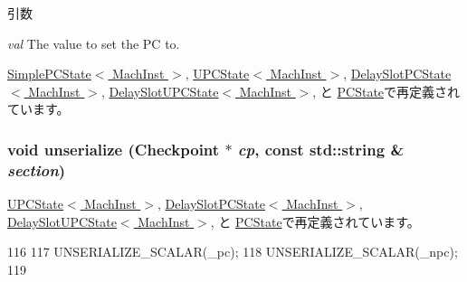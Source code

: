 \begin{DoxyParams}{引数}
\item[{\em val}]The value to set the PC to. \end{DoxyParams}


\hyperlink{classGenericISA_1_1SimplePCState_a9a5b900e841dd75dc81970850547918f}{SimplePCState$<$ MachInst $>$}, \hyperlink{classGenericISA_1_1UPCState_a9a5b900e841dd75dc81970850547918f}{UPCState$<$ MachInst $>$}, \hyperlink{classGenericISA_1_1DelaySlotPCState_a9a5b900e841dd75dc81970850547918f}{DelaySlotPCState$<$ MachInst $>$}, \hyperlink{classGenericISA_1_1DelaySlotUPCState_a9a5b900e841dd75dc81970850547918f}{DelaySlotUPCState$<$ MachInst $>$}, と \hyperlink{classX86ISA_1_1PCState_a9a5b900e841dd75dc81970850547918f}{PCState}で再定義されています。\hypertarget{classGenericISA_1_1PCStateBase_af22e5d6d660b97db37003ac61ac4ee49}{
\subsubsection[{unserialize}]{\setlength{\rightskip}{0pt plus 5cm}void unserialize ({\bf Checkpoint} $\ast$ {\em cp}, \/  const std::string \& {\em section})}}
\label{classGenericISA_1_1PCStateBase_af22e5d6d660b97db37003ac61ac4ee49}


\hyperlink{classGenericISA_1_1UPCState_af22e5d6d660b97db37003ac61ac4ee49}{UPCState$<$ MachInst $>$}, \hyperlink{classGenericISA_1_1DelaySlotPCState_af22e5d6d660b97db37003ac61ac4ee49}{DelaySlotPCState$<$ MachInst $>$}, \hyperlink{classGenericISA_1_1DelaySlotUPCState_af22e5d6d660b97db37003ac61ac4ee49}{DelaySlotUPCState$<$ MachInst $>$}, と \hyperlink{classX86ISA_1_1PCState_af22e5d6d660b97db37003ac61ac4ee49}{PCState}で再定義されています。


\begin{DoxyCode}
116     {
117         UNSERIALIZE_SCALAR(_pc);
118         UNSERIALIZE_SCALAR(_npc);
119     }
\end{DoxyCode}


